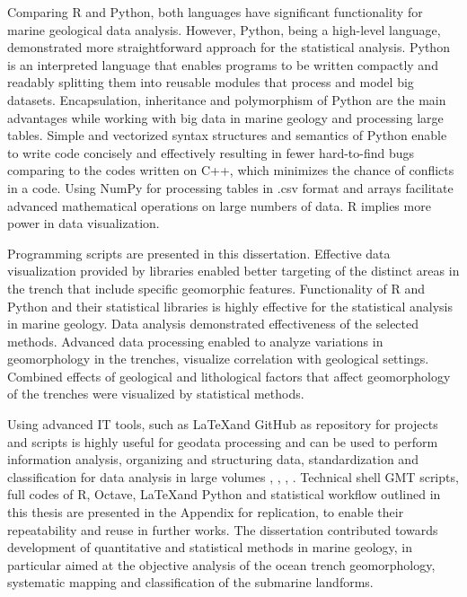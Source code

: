 \documentclass[11pt,a4paper]{report}
\begin{document}
{Comparing R and Python, both languages have significant functionality for marine geological data analysis. However, Python, being a high-level language, demonstrated more straightforward approach for the statistical analysis. Python is an interpreted language that enables programs to be written compactly and readably splitting them into reusable modules \cite{Rossumatal2018} that process and model big datasets. Encapsulation, inheritance and polymorphism of Python are the main advantages while working with big data in marine geology and processing large tables. Simple and vectorized syntax structures and semantics of Python enable to write code concisely and effectively resulting in fewer hard-to-find bugs comparing to the codes written on C++, which minimizes the chance of conflicts in a code. Using \ac{NumPy} for processing tables in .csv format and arrays facilitate advanced mathematical operations on large numbers of data. R implies more power in data visualization. 

Programming scripts are presented in this dissertation. Effective data visualization provided by libraries enabled better targeting of the distinct areas in the trench that include specific geomorphic features. Functionality of R and Python and their statistical libraries is highly effective for the statistical analysis in marine geology. Data analysis demonstrated effectiveness of the selected methods. Advanced data processing enabled to analyze variations in geomorphology in the trenches, visualize correlation with geological settings. Combined effects of geological and lithological factors that affect geomorphology of the trenches were visualized by statistical methods.

Using advanced IT tools, such as \LaTeX \space and GitHub as repository for projects and scripts is highly useful for geodata processing \cite{Lemenkova201518} and can be used to perform information analysis, organizing and structuring data, standardization and classification for data analysis in large volumes  \cite{Lemenkova201554}, \cite{Lemenkova201558}, \cite{Lemenkova2016e}, \cite{Lemenkova2016m}. Technical shell \ac{GMT} scripts, full codes of R, Octave, \LaTeX and Python and statistical workflow outlined in this thesis are presented in the Appendix for replication, to enable their repeatability and reuse in further works. The dissertation contributed towards development of quantitative and statistical methods in marine geology, in particular aimed at the objective analysis of the ocean trench geomorphology, systematic mapping and classification of the submarine landforms. 
	
}
\end{document}
